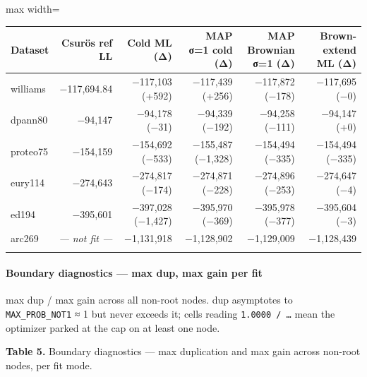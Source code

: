 \documentclass[
  10pt,
]{article}
\begin{document}
\begin{center}
\begin{adjustbox}{max width=\textwidth}
\begin{tabular}{@{}lrrrrr@{}}
\toprule\noalign{}
Dataset & Csurös ref LL & Cold ML (Δ) & MAP σ=1 cold (Δ) & \textbf{MAP
Brownian σ=1 (Δ)} & \textbf{Brown-extend ML (Δ)} \\
\midrule\noalign{}
williams & −117,694.84 & −117,103 (+592) & −117,439 (+256) & −117,872
(−178) & −117,695 (−0) \\
dpann80 & −94,147 & −94,178 (−31) & −94,339 (−192) & −94,258 (−111) &
−94,147 (+0) \\
proteo75 & −154,159 & −154,692 (−533) & −155,487 (−1,328) & −154,494
(−335) & −154,494 (−335) \\
eury114 & −274,643 & −274,817 (−174) & −274,871 (−228) & −274,896 (−253)
& −274,647 (−4) \\
ed194 & −395,601 & −397,028 (−1,427) & −395,970 (−369) & −395,978 (−377)
& −395,604 (−3) \\
arc269 & \emph{--- not fit ---} & −1,131,918 & −1,128,902 & −1,129,009 &
−1,128,439 \\
\bottomrule\noalign{}
\end{tabular}
\end{adjustbox}
\end{center}

\paragraph{Boundary diagnostics --- max dup, max gain per
fit}\label{boundary-diagnostics--max-dup-max-gain-per-fit}

max dup / max gain across all non-root nodes. dup asymptotes to
\texttt{MAX\_PROB\_NOT1} ≈ 1 but never exceeds it; cells reading
\texttt{1.0000\ /\ …} mean the optimizer parked at the cap on at least
one node.

\textbf{Table 5.} Boundary diagnostics --- max duplication and max gain
across non-root nodes, per fit mode.
\end{document}
